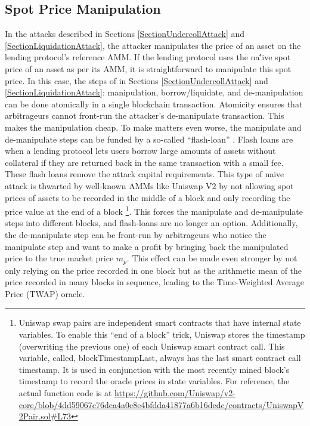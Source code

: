 \subsection{Spot Price Manipulation}
In the attacks described in Sections \ref{SectionUndercollAttack} and \ref{SectionLiquidationAttack}, the attacker manipulates the price of an asset on the lending protocol's reference AMM. If the lending protocol uses the na\''ive spot price of an asset as per its AMM, it is straightforward to manipulate this spot price. In this case, the steps of in Sections \ref{SectionUndercollAttack} and \ref{SectionLiquidationAttack}: manipulation, borrow/liquidate, and de-manipulation can be done atomically in a single blockchain transaction. Atomicity ensures that arbitrageurs cannot front-run the attacker's de-manipulate transaction. This makes the manipulation cheap. To make matters even worse, the manipulate and de-manipulate steps can be funded by a so-called ``flash-loan'' \cite{qin2021attacking}. Flash loans are when a lending protocol lets users borrow large amounts of assets without collateral if they are returned back in the same transaction with a small fee. These flash loans remove the attack capital requirements. This type of naive attack is thwarted by well-known AMMs like Uniswap V2 \cite{Adams2020UniV2} by not allowing spot prices of assets to be recorded in the middle of a block and only recording the price value at the end of a block \footnote{Uniswap swap pairs are independent smart contracts that have internal state variables. To enable this ``end of a block'' trick, Uniswap stores the timestamp (overwriting the previous one) of each Uniswap smart contract call. This variable, called, blockTimestampLast, always has the last smart contract call timestamp. It is used in conjunction with the most recently mined block's timestamp to record the oracle prices in state variables. For reference, the actual function code is at \url{https://github.com/Uniswap/v2-core/blob/4dd59067c76dea4a0e8e4bfdda41877a6b16dedc/contracts/UniswapV2Pair.sol#L73}}. This forces the manipulate and de-manipulate steps into different blocks, and flash-loans are no longer an option. Additionally, the de-manipulate step can be front-run by arbitrageurs who notice the manipulate step and want to make a profit by bringing back the manipulated price to the true market price $m_p$. This effect can be made even stronger by not only relying on the price recorded in one block but as the arithmetic mean of the price recorded in many blocks in sequence, leading to the Time-Weighted Average Price (TWAP) oracle.

